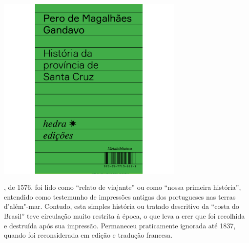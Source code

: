 \hspace*{-.4cm}\begin{minipage}[c]{.5\linewidth}
\small{
{}}
\end{minipage}

\pagebreak

\hspace{.5cm}

\begin{center}
\hspace*{-2.5cm}
\hspace*{2.5cm}\includegraphics[width=92mm]{./grid/gandavo.jpg}
\end{center}

\hspace*{-7cm}\hrulefill\hspace*{-7cm}

\medskip

, de 1576, foi lido como “relato de viajante” ou como “nossa primeira história”, entendido como testemunho de impressões antigas dos portugueses nas terras d’além"-mar. Contudo, esta simples história ou tratado descritivo da “costa do Brasil” teve circulação muito restrita à época, o que leva a crer que foi recolhida e destruída após sua impressão. Permaneceu praticamente ignorada até 1837, quando foi reconsiderada em edição e tradução francesa.

